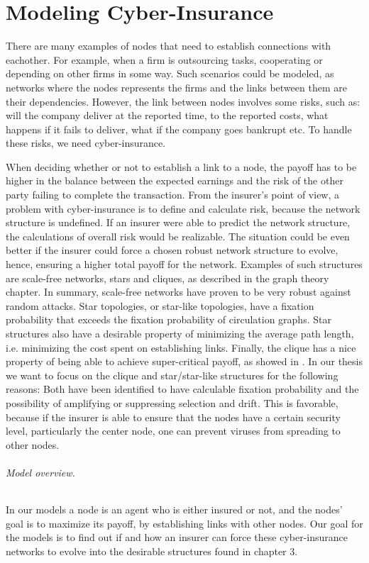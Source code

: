 \chapter{Modeling Cyber-Insurance }
\label{chp:modelingCyberInsurance} 

There are many examples of nodes that need to establish connections with eachother. For example, when a firm is outsourcing tasks, cooperating or depending on other firms in some way. Such scenarios could be modeled, as networks where the nodes represents the firms and the links between them are their dependencies.
However, the link between nodes involves some risks, such as: will the company deliver at the reported time, to the reported costs, what happens if it fails to deliver, what if the company goes bankrupt etc. To handle these risks, we need cyber-insurance.  

When deciding whether or not to establish a link to a node, the payoff has to be higher in the balance between the expected earnings and the risk of the other party failing to complete the transaction.
From the insurer's point of view, a problem with cyber-insurance is to define and calculate risk, because the network structure is undefined. If an insurer were able to predict the network structure, the calculations of overall risk would be realizable. The situation could be even better if the insurer could force a chosen robust network structure to evolve, hence, ensuring a higher total payoff for the network.
Examples of such structures are scale-free networks, stars and cliques, as described in the graph theory chapter. In summary, scale-free networks have proven to be very robust against random attacks. Star topologies, or star-like topologies, have a fixation probability that exceeds the fixation probability of circulation graphs. Star structures also have a desirable property of minimizing the average path length, i.e. minimizing the cost spent on establishing links. Finally, the clique has a nice property of being able to achieve super-critical payoff, as showed in \cite{contagion}.
In our thesis we want to focus on the clique and star/star-like structures for the following reasons: Both have been identified to have calculable fixation probability and the possibility of amplifying or suppressing selection and drift. This is favorable, because if the insurer is able to ensure that the nodes have a certain security level, particularly the center node, one can prevent viruses from spreading to other nodes.
\subparagraph{Model overview.}
In our models a node is an agent who is either insured or not, and the nodes' goal is to maximize its payoff, by establishing links with other nodes. Our goal for the models is to find out if and how an insurer can force these cyber-insurance networks to evolve into the desirable structures found in chapter 3.  

